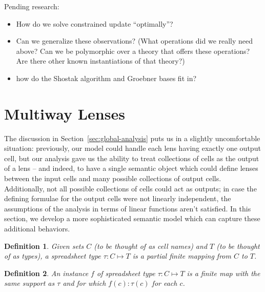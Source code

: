 \documentclass{article}
\newtheorem{definition}{Definition}
\begin{document}
Pending research:
\begin{itemize}
    \item How do we solve constrained update ``optimally''?
    \item Can we generalize these observations? (What operations did we
        really need above? Can we be polymorphic over a theory that offers
        these operations? Are there other known instantiations of that
        theory?)
    \item how do the Shostak algorithm and Groebner bases fit in?
\end{itemize}
\section{Multiway Lenses}
\label{sec:multiway}
The discussion in Section~\ref{sec:global-analysis} puts us in a slightly
uncomfortable situation: previously, our model could handle each lens having
exactly one output cell, but our analysis gave us the ability to treat
collections of cells as the output of a lens -- and indeed, to have a single
semantic object which could define lenses between the input cells and many
possible collections of output cells. Additionally, not all possible
collections of cells could act as outputs; in case the defining formulae for
the output cells were not linearly independent, the assumptions of the
analysis in terms of linear functions aren't satisfied. In this section, we
develop a more sophisticated semantic model which can capture these
additional behaviors. %

\newcommand{\sto}{\mapsto}
\newcommand{\mlens}[1]{\mathcal M(#1)}
\newcommand{\mput}{\mathit{put}}
\newcommand{\danger}{\mathcal D}

\begin{definition}
    Given sets $C$ (to be thought of as cell names) and $T$ (to be thought
    of as types), a \emph{spreadsheet type} $\tau : C \sto T$ is a partial
    finite mapping from $C$ to $T$.
\end{definition}

\begin{definition}
    An \emph{instance} $f$ of spreadsheet type $\tau : C \sto T$ is a finite
    map with the same support as $\tau$ and for which $f(c) : \tau(c)$ for
    each $c$.
\end{definition}
\end{document}
